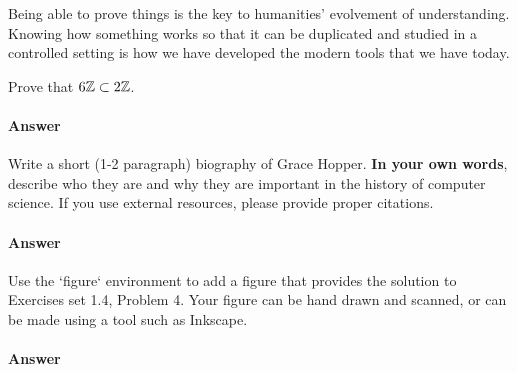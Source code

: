 \documentclass{article}
\begin{document}
Being able to prove things is the key to humanities' evolvement of understanding. Knowing how something works so that it can be duplicated and studied in a controlled setting is how we have developed the modern tools that we have today. 


\collab{\todo{}}

Prove that $6{\mathbb Z} \subset 2{\mathbb Z}$.

\paragraph{Answer}



\collab{\todo{}}

Write a short (1-2 paragraph) biography of Grace Hopper.
\textbf{In your own words}, describe who they are and why they are important in
the history of computer science.  If you use external resources, please provide
proper citations.

\paragraph{Answer}


\collab{\todo{}}

Use the `figure` environment to add a figure that provides the solution to
Exercises set 1.4, Problem 4.  Your figure can be hand drawn and scanned, or can
be made using a tool such as Inkscape.

\paragraph{Answer}

\end{document}
